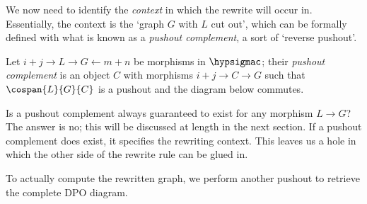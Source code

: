 We now need to identify the \emph{context} in which the rewrite will occur in.
Essentially, the context is the `graph \(G\) with \(L\) cut out', which can be
formally defined with what is known as a \emph{pushout complement}, a sort of
`reverse pushout'.

\begin{definition}\label{def:pushout-complement}
    Let \(i+j \to L \to G \leftarrow m+n\) be morphisms in
    \(\hypsigmac\); their \emph{pushout complement} is an object \(C\)
    with morphisms \(i+j \to C \to G\) such that \(\cospan{L}{G}{C}\) is a
    pushout and the diagram below commutes.
    \begin{center}
    \end{center}
\end{definition}

Is a pushout complement always guaranteed to exist for any morphism \(L \to G\)?
The answer is no; this will be discussed at length in the next section.
If a pushout complement does exist, it specifies the rewriting context.
This leaves us a hole in which the other side of the rewrite rule can be glued
in.

\begin{center}
\end{center}

To actually compute the rewritten graph, we perform another pushout to retrieve
the complete DPO diagram.

